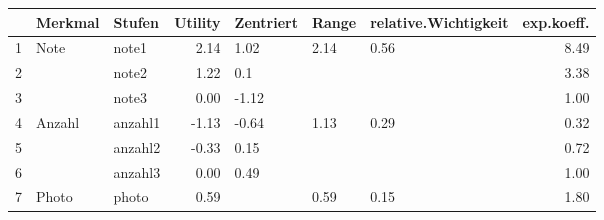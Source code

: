 \begin{table}[ht]
\centering
\begin{tabular}{rllrlllr}
  \hline
 & Merkmal & Stufen & Utility & Zentriert & Range & relative.Wichtigkeit & exp.koeff. \\ 
  \hline
1 & Note & note1 & 2.14 & 1.02 & 2.14 & 0.56 & 8.49 \\ 
  2 &  & note2 & 1.22 & 0.1 &  &  & 3.38 \\ 
  3 &  & note3 & 0.00 & -1.12 &  &  & 1.00 \\ 
  4 & Anzahl & anzahl1 & -1.13 & -0.64 & 1.13 & 0.29 & 0.32 \\ 
  5 &  & anzahl2 & -0.33 & 0.15 &  &  & 0.72 \\ 
  6 &  & anzahl3 & 0.00 & 0.49 &  &  & 1.00 \\ 
  7 & Photo & photo & 0.59 &  & 0.59 & 0.15 & 1.80 \\ 
   \hline
\end{tabular}
\end{table}
